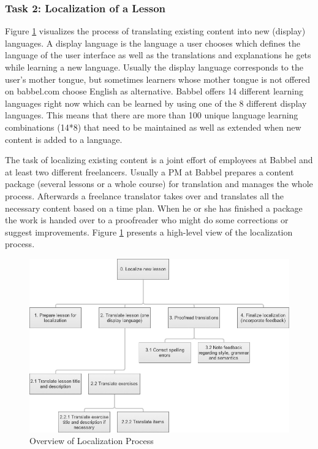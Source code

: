 \subsubsection{Task 2: Localization of a Lesson} \label{sec:task-localization}
Figure \ref{fig:loc-overview} visualizes the process of translating existing content into new (display) languages. A display language is the language a user chooses which defines the language of the user interface as well as the translations and explanations he gets while learning a new language. Usually the display language corresponds to the user’s mother tongue, but sometimes learners whose mother tongue is not offered on babbel.com choose English as alternative. Babbel offers 14 different learning languages right now which can be learned by using one of the 8 different display languages. This means that there are more than 100 unique language learning combinations (14*8) that need to be maintained as well as extended when new content is added to a language.

The task of localizing existing content is a joint effort of employees at Babbel and at least two different freelancers. Usually a \ac{PM} at Babbel prepares a content package (several lessons or a whole course) for translation and manages the whole process. Afterwards a freelance translator takes over and translates all the necessary content based on a time plan. When he or she has finished a package the work is handed over to a proofreader who might do some corrections or suggest improvements. Figure \ref{fig:loc-overview} presents a high-level view of the localization process.

\begin{figure}[h]
 \centering
 \includegraphics[width=\textwidth]{images/task-analysis/localize_lesson}
 \caption{Overview of Localization Process}
 \label{fig:loc-overview}
\end{figure}

